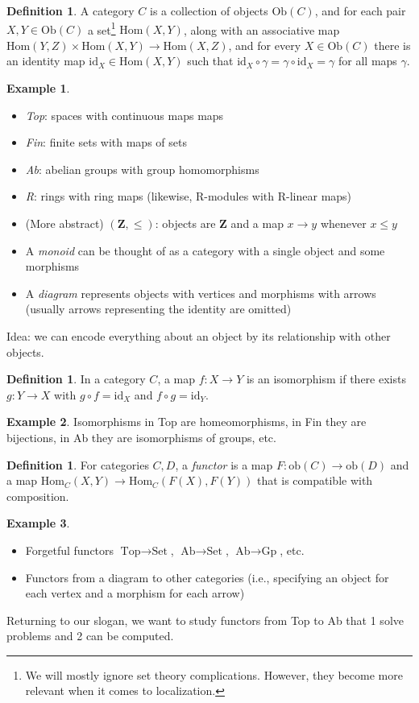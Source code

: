 \documentclass[10pt]{article}
\theoremstyle{definition}
\newtheorem{definition}[theorem]{Definition}
\newtheorem*{example}{Example}
\begin{document}
	\begin{definition}
		A category $C$ is a collection of objects $\text{Ob}(C)$, and for each pair $X,Y\in\text{Ob}(C)$ a set\footnote{We will mostly ignore set theory complications. However, they become more relevant when it comes to localization.} $\text{Hom}(X,Y)$, along with an associative map $\text{Hom}(Y,Z)\times \text{Hom}(X,Y)\to\text{Hom}(X,Z)$, and for every $X\in\text{Ob}(C)$ there is an identity map $\text{id}_X\in\text{Hom}(X,Y)$ such that $\text{id}_{X}\circ\gamma=\gamma\circ\text{id}_{X}=\gamma$ for all maps $\gamma$. 
	\end{definition} 
	\begin{example}
		\begin{itemize}
			\item \emph{Top}: spaces with continuous maps maps
			\item \emph{Fin}: finite sets with maps of sets
			\item \emph{Ab}: abelian groups with group homomorphisms
			\item \emph{R}: rings with ring maps (likewise, R-modules with R-linear maps)
			\item (More abstract) $(\mathbf{Z},\leq)$: objects are $\mathbf{Z}$ and a map $x\to y$ whenever $x\leq y$
			\item A \emph{monoid} can be thought of as a category with a single object and some morphisms
			\item A \emph{diagram} represents objects with vertices and morphisms with arrows (usually arrows representing the identity are omitted)
		\end{itemize}
	\end{example}
	Idea: we can encode everything about an object by its relationship with other objects. 
	\begin{definition}
		In a category $C$, a map $f:X\to Y$ is an isomorphism if there exists $g:Y\to X$ with $g\circ f=\text{id}_{X}$ and $f\circ g=\text{id}_{Y}$.
	\end{definition}
	\begin{example}
		Isomorphisms in Top are homeomorphisms, in Fin they are bijections, in Ab they are isomorphisms of groups, etc.
	\end{example}
	\begin{definition}
		For categories $C,D$, a \emph{functor} is a map $F:\text{ob}(C)\to \text{ob}(D)$ and a map $\text{Hom}_{C}(X,Y)\to\text{Hom}_{C}(F(X),F(Y))$ that is compatible with composition. 
	\end{definition}
	\begin{example}
		\begin{itemize}
			\item Forgetful functors $\text{Top}\to\text{Set}$, $\text{Ab}\to\text{Set}$, $\text{Ab}\to\text{Gp}$, etc. 
			\item Functors from a diagram to other categories (i.e., specifying an object for each vertex and a morphism for each arrow)
		\end{itemize}
	\end{example}
	Returning to our slogan, we want to study functors from Top to Ab that 1 solve problems and 2 can be computed. 
	
\end{document}

